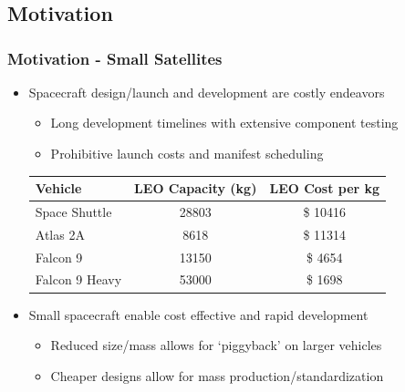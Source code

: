 
\section*{}
\subsection*{Motivation}  

\begin{frame} %
\frametitle{Motivation - Small Satellites} %
    \begin{itemize}
        \item Spacecraft design/launch and development are costly endeavors
            \begin{itemize}
                \item Long development timelines with extensive component testing
                \item Prohibitive launch costs and manifest scheduling
            \end{itemize}
            \pause
                    
        \begin{tabular}{l | c | c }
            Vehicle & LEO Capacity (\si{\kilogram}) & LEO Cost per \si{\kilogram} \\
            \hline \hline
            Space Shuttle & \num{28803} & \$ \num{10416}  \\ 
            Atlas 2A & \num{8618} & \$ \num{11314} \\
            Falcon 9 & \num{13150} & \$ \num{4654} \\
            Falcon 9 Heavy & \num{53000} & \$ \num{1698}
        \end{tabular}
        
        \item Small spacecraft enable cost effective and rapid development
    
            \begin{itemize}
                \item Reduced size/mass allows for `piggyback' on larger vehicles
                \item Cheaper designs allow for mass production/standardization 
            \end{itemize}

    \end{itemize}
    
\end{frame}   %

